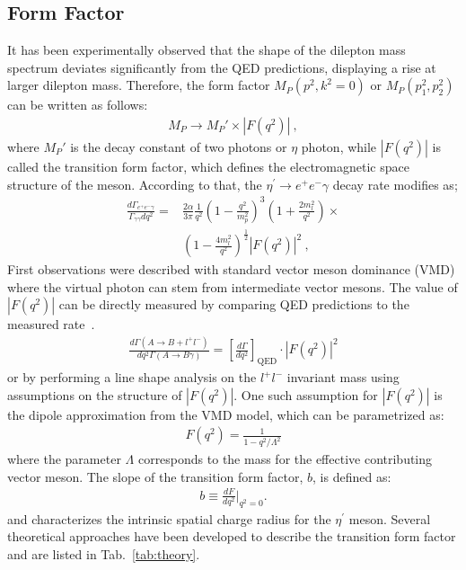 \documentclass[11pt,a4paper,twocolumn]{article}
\def\etaP{\eta^{\prime}}
\def\epem{e^+e^-}
\begin{document}
	\subsection{Form Factor}
	It has been experimentally observed that the shape of the dilepton mass spectrum deviates significantly from the QED predictions, displaying a rise at larger dilepton mass. Therefore, the form factor ${M}_P(p^2,k^2=0)$ or ${M}_P(p_{1}^2,p_{2}^2)$  can be written as follows:
	\begin{align}
	{M}_P \to {M}_P' \times \left|F(q^2)\right| \ ,
	\end{align}
	where $M_P'$ is the decay constant of two photons or $\eta$ photon, while $\left|F(q^2)\right|$ is called the transition form factor, which defines the electromagnetic space structure of the meson. According to that, the $\etaP \to e^+e^- \gamma$ decay rate modifies as;
	\begin{align*}\label{eq:eegff.final}
	\frac{d\Gamma_{\epem \gamma}}{\Gamma_{\gamma\gamma} dq^2} = & \frac{2 \alpha}{3 \pi} \frac{1}{q^2} \left( 1- \frac{q^2}{m_p^2}\right)^3 \left( 1+ \frac{2m_l^2}{q^2}\right) \times \\ & \left( 1- \frac{4m_l^2}{q^2}\right)^{\frac{1}{2}} \left|F(q^2)\right|^2 \ ,
	\end{align*}
	First observations were described with standard vector meson dominance (VMD) where the virtual photon can stem from intermediate vector mesons. 
	The value of $\left|F(q^2)\right|$ can be directly measured by comparing QED predictions to the measured rate~\cite{landsberg}. 
	\begin{align}
	\frac{d\Gamma(A\to B+l^+l^-)}{dq^2 \Gamma(A\to B\gamma)} = \left[\frac{d\Gamma}{dq^2}\right]_{\text{QED}} \cdot \left | F(q^2) \right |^2 
	\end{align}
	or by performing a line shape analysis on the $l^{+}l^{-}$ invariant mass using assumptions on the structure of $\left|F(q^2)\right|$. One such assumption for $\left|F(q^2)\right|$ is the dipole approximation from the VMD model, which can be parametrized as:
	\begin{align}\label{TFFbitch}
	F(q^2) = \frac{1}{1-q^2/\Lambda^2} 
	\end{align}
	where the parameter $\Lambda$ corresponds to the mass for the effective contributing vector meson.	
	The slope of the transition form factor, $b$, is defined as:
	\begin{align}
	b \equiv \frac{dF}{dq^2}|_{q^2=0} \label{eq:tffslope}.
	\end{align}
	and characterizes the intrinsic spatial charge radius for the $\etaP$ meson. Several theoretical approaches have been developed to describe the transition form factor and are listed in Tab.~\ref{tab:theory}.
\end{document}
